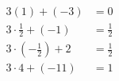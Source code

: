 \documentclass[preview]{standalone}
\begin{document}
\begin{align*}
3(1)+(-3) & = 0 \\ 3\cdot\frac{1}{2}+(-1) & = \frac{1}{2} \\ 3\cdot(-\frac{1}{2}) + 2  & = \frac{1}{2} \\ 3\cdot4 + (-11)  & = 1
\end{align*}
\end{document}

